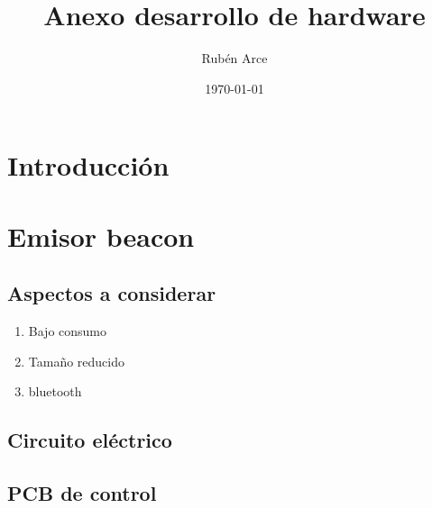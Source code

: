 \documentclass[a4paper ,12pt, onecolumn]{article}
\begin{document}
\title{Anexo desarrollo de hardware}

\author{Rubén Arce}
\date{\today}
\maketitle
\cleardoublepage
\tableofcontents
\cleardoublepage

\section{Introducción}
\section{Emisor beacon}
    \subsection{Aspectos a considerar}
        \begin{enumerate}
            \item Bajo consumo
            \item Tamaño reducido
            \item bluetooth
        \end{enumerate}
    \subsection{Circuito eléctrico}
    \subsection{PCB de control}
\end{document}

